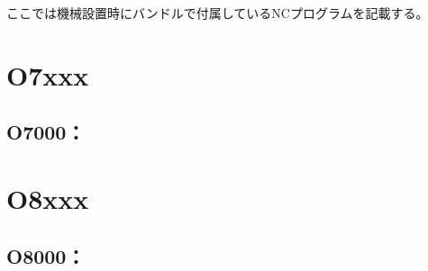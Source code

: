 
ここでは機械設置時にバンドルで付属しているNCプログラムを記載する。



\section{O7xxx}


\subsection{O7000：}
%



\section{O8xxx}


\subsection{O8000：}
%
